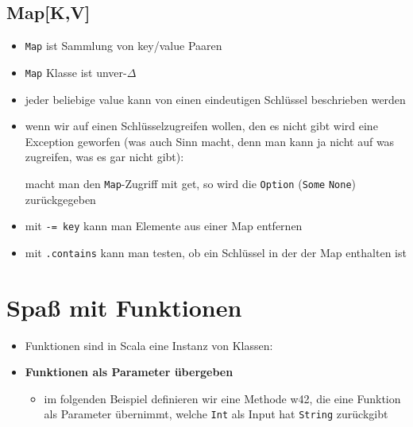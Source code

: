 \subsection{Map[K,V]}
\begin{itemize}
  \item \texttt{Map} ist Sammlung von key/value Paaren
  \item \texttt{Map} Klasse ist unver-$\Delta$
  \item jeder beliebige value kann von einen eindeutigen Schlüssel
  beschrieben werden
    
  \item wenn wir auf einen Schlüsselzugreifen wollen, den es nicht
  gibt wird eine Exception geworfen (was auch Sinn macht, denn man
  kann ja nicht auf was zugreifen, was es gar nicht gibt):
 
  

  macht man den \texttt{Map}-Zugriff mit get, so wird die 
  \texttt{Option} (\texttt{Some} \oder \texttt{None}) zurückgegeben
  \item mit \texttt{-= key} kann man Elemente aus einer Map entfernen
  \item mit \texttt{.contains} kann man testen, ob ein Schlüssel in der
  der Map enthalten ist
\end{itemize}
\pagebreak


\section{Spaß mit Funktionen}
\begin{itemize}
  \item Funktionen sind in Scala eine Instanz von Klassen:
  
  
  
  \item \textbf{Funktionen als Parameter übergeben}
  \begin{itemize}
    \item im folgenden Beispiel definieren wir eine Methode w42, die eine
    Funktion als Parameter übernimmt, welche \texttt{Int} als Input hat 
    \und \texttt{String} zurückgibt
    
    
    
  \end{itemize}
\end{itemize}


